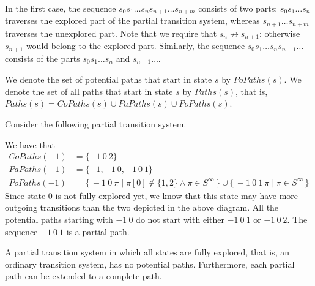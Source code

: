 \documentclass[12pt]{article}
\theoremstyle{definition}
\begin{document}
In the first case, the sequence $s_0 s_1 \ldots s_n s_{n+1} \ldots s_{n+m}$ consists of two parts: $s_0 s_1 \ldots s_n$ traverses the explored part of the partial transition system, whereas $s_{n+1} \ldots s_{n+m}$ traverses the unexplored part.  Note that we require that $s_n \not\rightarrow s_{n+1}$: otherwise $s_{n+1}$ would belong to the explored part.  Similarly, the sequence $s_0 s_1 \ldots s_n s_{n+1} \ldots$ consists of the parts $s_0 s_1 \ldots s_n$ and $s_{n+1} \ldots$.  

We denote the set of potential paths that start in state $s$ by $\mathit{PoPaths}(s)$.  We denote the set of all paths that start in state $s$ by $\mathit{Paths}(s)$, that is, $\mathit{Paths}(s) = \mathit{CoPaths}(s) \cup \mathit{PaPaths}(s) \cup \mathit{PoPaths}(s)$.

Consider the following partial transition system.
\begin{center}
\end{center}
We have that
\begin{align*}
\mathit{CoPaths}(-1) & = \{ -1\ 0\ 2 \}\\
\mathit{PaPaths}(-1) & = \{ -1, -1\ 0, -1\ 0\ 1 \}\\
\mathit{PoPaths}(-1) & = \{\, -1\ 0\ \pi \mid \pi[0] \not\in \{ 1, 2 \} \wedge \pi \in S^{\infty} \,\} \cup \{\, -1\ 0\ 1\ \pi \mid \pi \in S^{\infty} \,\}
\end{align*}
Since state 0 is not fully explored yet, we know that this state may have more outgoing transitions than the two depicted in the above diagram.  All the potential paths starting with $-1\ 0$ do not start with either $-1\ 0\ 1$ or $-1\ 0\ 2$.  The sequence $-1\ 0\ 1$ is a partial path.

A partial transition system in which all states are fully explored, that is, an ordinary transition system, has no potential paths.  Furthermore, each partial path can be extended to a complete path.
\end{document}
